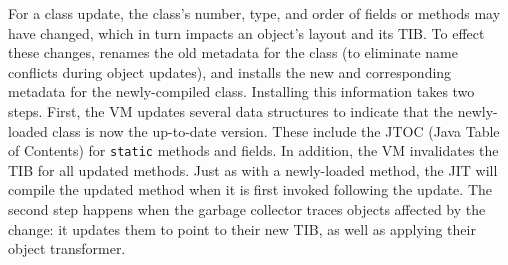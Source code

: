 For a class update, the class's number, type, and order of fields or
methods may have changed, which in turn impacts an object's layout and
its TIB.  To effect these changes, \DSU{} renames the old metadata for
the class (to eliminate name conflicts during object updates), and installs the new
\VMClass{} and corresponding metadata for the newly-compiled class.
Installing this information takes two steps.  First, the VM updates
several \JikesRVM{} data structures to indicate that the newly-loaded class
is now the up-to-date version.  These include the JTOC (Java Table of
Contents) for \texttt{static} methods and fields.  In addition, the VM
invalidates the TIB for all updated methods.  Just as with a
newly-loaded method, the \acs{JIT} will compile the updated method when it
is first invoked following the update.
The second step happens when the garbage collector traces objects
affected by the change: it updates them to point to their new TIB, as
well as applying their object transformer.





